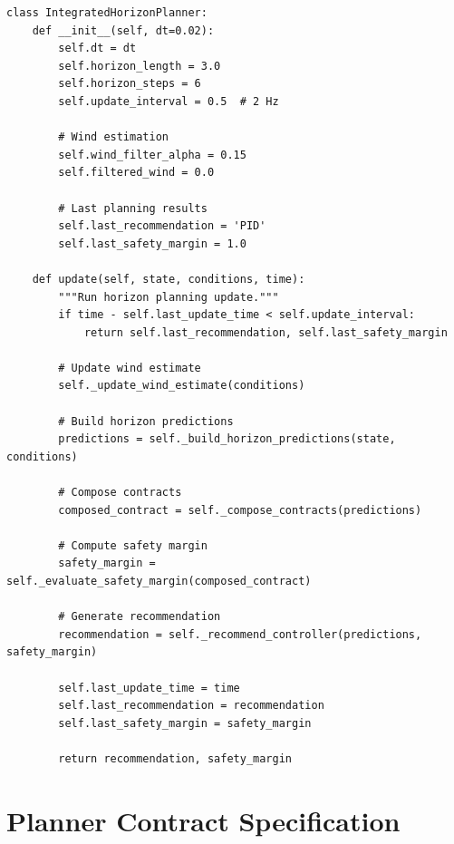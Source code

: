 \begin{lstlisting}[caption={IntegratedHorizonPlanner class structure}]
class IntegratedHorizonPlanner:
    def __init__(self, dt=0.02):
        self.dt = dt
        self.horizon_length = 3.0
        self.horizon_steps = 6
        self.update_interval = 0.5  # 2 Hz

        # Wind estimation
        self.wind_filter_alpha = 0.15
        self.filtered_wind = 0.0

        # Last planning results
        self.last_recommendation = 'PID'
        self.last_safety_margin = 1.0

    def update(self, state, conditions, time):
        """Run horizon planning update."""
        if time - self.last_update_time < self.update_interval:
            return self.last_recommendation, self.last_safety_margin

        # Update wind estimate
        self._update_wind_estimate(conditions)

        # Build horizon predictions
        predictions = self._build_horizon_predictions(state, conditions)

        # Compose contracts
        composed_contract = self._compose_contracts(predictions)

        # Compute safety margin
        safety_margin = self._evaluate_safety_margin(composed_contract)

        # Generate recommendation
        recommendation = self._recommend_controller(predictions, safety_margin)

        self.last_update_time = time
        self.last_recommendation = recommendation
        self.last_safety_margin = safety_margin

        return recommendation, safety_margin
\end{lstlisting}

\section{Planner Contract Specification}

